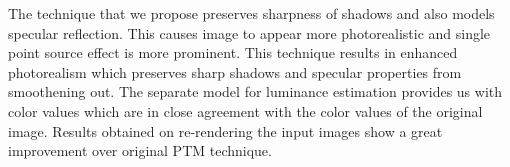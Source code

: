 The technique that we propose preserves sharpness of shadows and also models
specular reflection. This causes image to appear more photorealistic and single
point source effect is more prominent. This technique results in enhanced
photorealism which preserves sharp shadows and specular properties from
smoothening out. The separate model for luminance estimation provides us with
color values which are in close agreement with the color values of the original
image. Results obtained on re-rendering the input images show a great
improvement over original PTM technique.

% 
